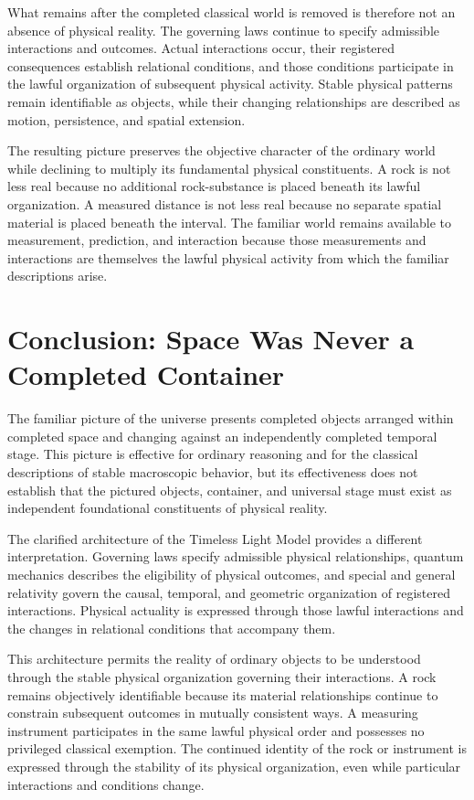 \documentclass[12pt,onecolumn]{article}
\begin{document}
What remains after the completed classical world is removed is therefore not an absence of physical reality. The governing laws continue to specify admissible interactions and outcomes. Actual interactions occur, their registered consequences establish relational conditions, and those conditions participate in the lawful organization of subsequent physical activity. Stable physical patterns remain identifiable as objects, while their changing relationships are described as motion, persistence, and spatial extension.

The resulting picture preserves the objective character of the ordinary world while declining to multiply its fundamental physical constituents. A rock is not less real because no additional rock-substance is placed beneath its lawful organization. A measured distance is not less real because no separate spatial material is placed beneath the interval. The familiar world remains available to measurement, prediction, and interaction because those measurements and interactions are themselves the lawful physical activity from which the familiar descriptions arise.

\section{Conclusion: Space Was Never a Completed Container}

The familiar picture of the universe presents completed objects arranged within completed space and changing against an independently completed temporal stage. This picture is effective for ordinary reasoning and for the classical descriptions of stable macroscopic behavior, but its effectiveness does not establish that the pictured objects, container, and universal stage must exist as independent foundational constituents of physical reality.

The clarified architecture of the Timeless Light Model provides a different interpretation. Governing laws specify admissible physical relationships, quantum mechanics describes the eligibility of physical outcomes, and special and general relativity govern the causal, temporal, and geometric organization of registered interactions. Physical actuality is expressed through those lawful interactions and the changes in relational conditions that accompany them.

This architecture permits the reality of ordinary objects to be understood through the stable physical organization governing their interactions. A rock remains objectively identifiable because its material relationships continue to constrain subsequent outcomes in mutually consistent ways. A measuring instrument participates in the same lawful physical order and possesses no privileged classical exemption. The continued identity of the rock or instrument is expressed through the stability of its physical organization, even while particular interactions and conditions change.
\end{document}
